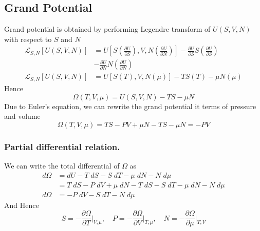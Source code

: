 \documentclass[../../../Main.tex]{subfiles}
\begin{document}
\subsection*{Grand Potential}
Grand potential is obtained by performing Legendre transform of $U(S,V,N)$ with respect to $S$ and $N$
\begin{align*}
    \mathcal{L}_{S,N}\left[U(S,V,N)\right]&= U\left[S\left(\frac{\partial U}{\partial S}\right),V,N\left(\frac{\partial U}{\partial N}\right)\right] - \frac{\partial U}{\partial S}S\left(\frac{\partial U}{\partial S}\right)\\
    &- \frac{\partial U}{\partial N}N\left(\frac{\partial U}{\partial N}\right) \\
    \mathcal{L}_{S,N}\left[U(S,V,N)\right]&=U\left[S(T),V,N(\mu)\right]- TS(T)-\mu N(\mu)
\end{align*}
Hence
\begin{equation*}
    \Omega(T,V,\mu)=U(S,V,N)-TS-\mu N
\end{equation*}
Due to Euler's equation, we can rewrite the grand potential it terms of pressure and volume
\begin{equation*}
    \Omega(T,V,\mu)=TS-PV+\mu N-TS-\mu N=-PV
\end{equation*}

\subsubsection*{Partial differential relation.} We can write the total differential of $\Omega$ as 
\begin{align*}
    d\Omega&= dU-T\;dS- S\;dT-\mu \;dN-N\;d\mu\\
    &=T\;dS-P\;dV+\mu\;dN-T\;dS- S\;dT-\mu \;dN-N\;d\mu\\
    d\Omega&=-P\;dV-S\;dT-N\;d\mu
\end{align*}
And Hence 
\begin{equation*}
    S=-\frac{\partial \Omega}{\partial T}\bigg|_{V,\mu},\quad P=-\frac{\partial \Omega}{\partial V}\bigg|_{T,\mu},\quad N=-\frac{\partial \Omega}{\partial \mu}\bigg|_{T,V}
\end{equation*}
\end{document}
